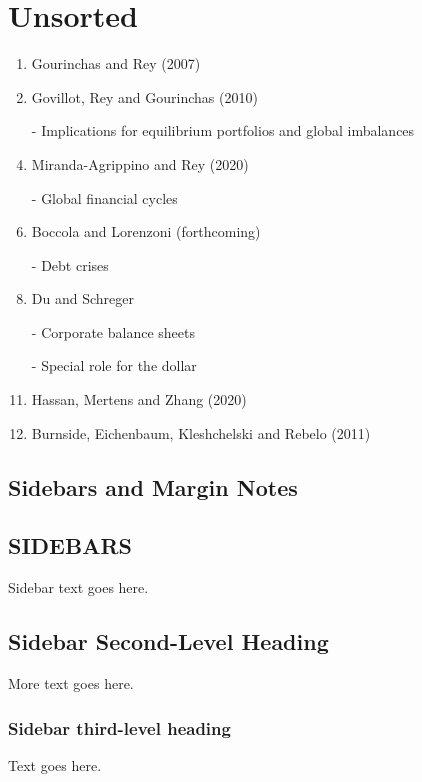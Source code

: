 \documentclass{ar-1col}
\begin{document}
\section{Unsorted}
\begin{enumerate}
\item Gourinchas and Rey (2007)
\item Govillot, Rey and Gourinchas (2010)
\item[-] Implications for equilibrium portfolios and global imbalances
\item Miranda-Agrippino and Rey (2020)
\item[-] Global financial cycles
\item Boccola and Lorenzoni (forthcoming)
\item[-] Debt crises
\item Du and Schreger
\item[-] Corporate balance sheets
\item[-] Special role for the dollar
\item Hassan, Mertens and Zhang (2020)
\item Burnside, Eichenbaum, Kleshchelski and Rebelo (2011)
\end{enumerate}



\subsection{Sidebars and Margin Notes}
\begin{marginnote}[]
    
\end{marginnote}

\begin{textbox}[h]\section{SIDEBARS}
  Sidebar text goes here.
  \subsection{Sidebar Second-Level Heading}
  More text goes here.\subsubsection{Sidebar third-level heading} Text
  goes here.\end{textbox}
\end{document}
